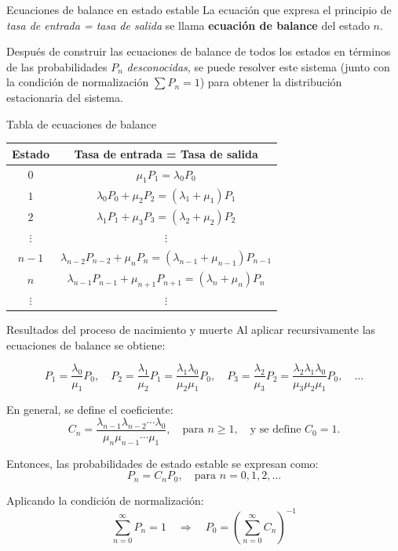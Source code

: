 \documentclass{beamer}
\begin{document}
\begin{frame}{Ecuaciones de balance en estado estable}
\justifying
La ecuación que expresa el principio de \textit{tasa de entrada = tasa de salida} se llama \textbf{ecuación de balance} del estado $n$. 

\medskip
Después de construir las ecuaciones de balance de todos los estados en términos de las probabilidades $P_n$ \textit{desconocidas}, se puede resolver este sistema (junto con la condición de normalización $\sum P_n = 1$) para obtener la distribución estacionaria del sistema.
\end{frame}

\begin{frame}{Tabla de ecuaciones de balance}
\centering
\renewcommand{\arraystretch}{1.6}
\begin{tabular}{|c|c|}
\hline
\textbf{Estado} & \textbf{Tasa de entrada = Tasa de salida} \\
\hline
$0$ & $\mu_1 P_1 = \lambda_0 P_0$ \\
$1$ & $\lambda_0 P_0 + \mu_2 P_2 = (\lambda_1 + \mu_1) P_1$ \\
$2$ & $\lambda_1 P_1 + \mu_3 P_3 = (\lambda_2 + \mu_2) P_2$ \\
$\vdots$ & $\vdots$ \\
$n{-}1$ & $\lambda_{n-2} P_{n-2} + \mu_n P_n = (\lambda_{n-1} + \mu_{n-1}) P_{n-1}$ \\
$n$ & $\lambda_{n-1} P_{n-1} + \mu_{n+1} P_{n+1} = (\lambda_n + \mu_n) P_n$ \\
$\vdots$ & $\vdots$ \\
\hline
\end{tabular}
\end{frame}

\begin{frame}{Resultados del proceso de nacimiento y muerte}
\justifying
Al aplicar recursivamente las ecuaciones de balance se obtiene:

\[
P_1 = \frac{\lambda_0}{\mu_1} P_0, \quad
P_2 = \frac{\lambda_1}{\mu_2} P_1 = \frac{\lambda_1 \lambda_0}{\mu_2 \mu_1} P_0, \quad
P_3 = \frac{\lambda_2}{\mu_3} P_2 = \frac{\lambda_2 \lambda_1 \lambda_0}{\mu_3 \mu_2 \mu_1} P_0, \quad \ldots
\]

\medskip
En general, se define el coeficiente:
\[
C_n = \frac{\lambda_{n-1} \lambda_{n-2} \cdots \lambda_0}{\mu_n \mu_{n-1} \cdots \mu_1}, \quad \text{para } n \geq 1, \quad \text{y se define } C_0 = 1.
\]

Entonces, las probabilidades de estado estable se expresan como:
\[
P_n = C_n P_0, \quad \text{para } n = 0, 1, 2, \dots
\]

\medskip
Aplicando la condición de normalización:
\[
\sum_{n=0}^\infty P_n = 1 \quad \Rightarrow \quad P_0 = \left( \sum_{n=0}^\infty C_n \right)^{-1}
\]
\end{frame}
\end{document}
